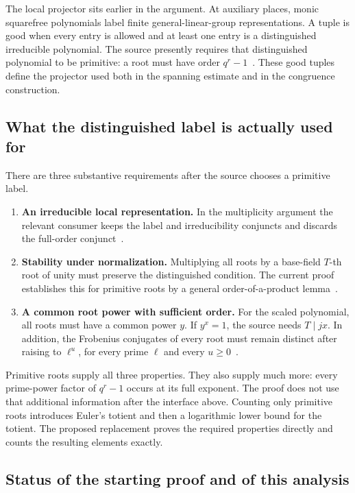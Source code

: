 \documentclass[11pt,a4paper]{article}
\theoremstyle{definition}
\theoremstyle{remark}
\begin{document}
The local projector sits earlier in the argument. At auxiliary places,
monic squarefree polynomials label finite general-linear-group
representations. A tuple is good when every entry is allowed and at least
one entry is a distinguished irreducible polynomial. The source presently
requires that distinguished polynomial to be primitive: a root must have
order $q^r-1$~\cite{labels}. These good tuples define the projector used
both in the spanning estimate and in the congruence construction.

\subsection{What the distinguished label is actually used for}

There are three substantive requirements after the source chooses a
primitive label.
\begin{enumerate}
\item \textbf{An irreducible local representation.} In the multiplicity
argument the relevant consumer keeps the label and irreducibility
conjuncts and discards the full-order conjunct~\cite{multiplicities}.
\item \textbf{Stability under normalization.} Multiplying all roots by a
base-field $T$-th root of unity must preserve the distinguished condition.
The current proof establishes this for primitive roots by a general
order-of-a-product lemma~\cite{labels,rows}.
\item \textbf{A common root power with sufficient order.} For the scaled
polynomial, all roots must have a common power $y$. If $y^x=1$, the source
needs $T\mid jx$. In addition, the Frobenius conjugates of every root must
remain distinct after raising to $\ell^u$, for every prime $\ell$ and every
$u\ge0$~\cite{rows}.
\end{enumerate}

Primitive roots supply all three properties. They also supply much more:
every prime-power factor of $q^r-1$ occurs at its full exponent. The proof
does not use that additional information after the interface above.
Counting only primitive roots introduces Euler's totient and then a
logarithmic lower bound for the totient. The proposed replacement proves
the required properties directly and counts the resulting elements
exactly.

\subsection{Status of the starting proof and of this analysis}
\end{document}
